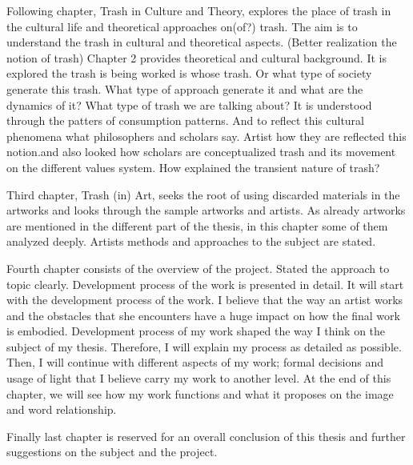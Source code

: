 
Following chapter, Trash in Culture and Theory, explores the place of trash in the cultural life and theoretical approaches on(of?) trash. The aim is to understand the trash in cultural and theoretical aspects. (Better realization the notion of trash) Chapter 2 provides theoretical and cultural background. It is explored the trash is being worked is whose trash. Or what type of society generate this trash. What type of approach generate it and what are the dynamics of it? What type of trash we are talking about? It is understood through the patters of consumption patterns. And to reflect this cultural phenomena what philosophers and scholars say. Artist how they are reflected this notion.and also looked how scholars are conceptualized trash and its movement on the different values system. How explained the transient nature of trash?

Third chapter, Trash (in) Art, seeks the root of using discarded materials in the artworks and looks through the sample artworks and artists. As already artworks are mentioned in the different part of the thesis, in this chapter some of them analyzed deeply. Artists methods and approaches to the subject are stated.

Fourth chapter consists of the overview of the project. Stated the approach to topic clearly. Development process of the work is presented in detail. It will start with the development process of the work. I believe that the way an artist works and the obstacles that she encounters have a huge impact on how the final work is embodied. Development process of my work shaped the way I think on the subject of my thesis. Therefore, I will explain my process as detailed as possible. Then, I will continue with different aspects of my work; formal decisions and usage of light that I believe carry my work to another level. At the end of this chapter, we will see how my work functions and what it proposes on the image and word relationship. 

Finally last chapter is reserved for an overall conclusion of this thesis and further suggestions on the subject and the project.





